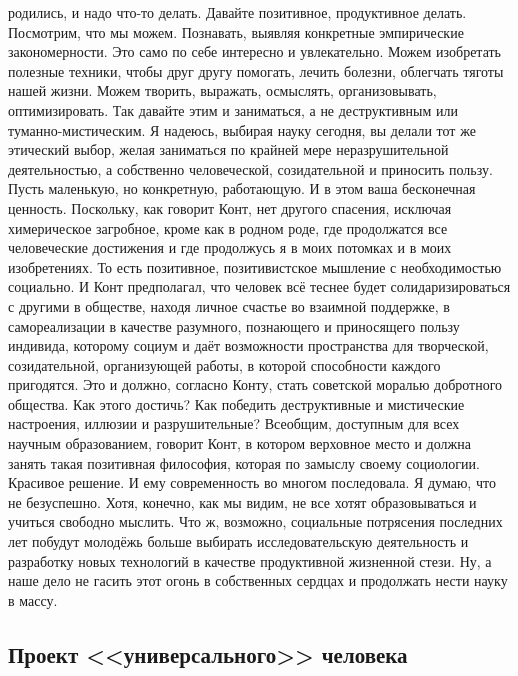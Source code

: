 родились, и надо что-то делать. Давайте позитивное, продуктивное делать.
Посмотрим, что мы можем. Познавать, выявляя конкретные эмпирические
закономерности. Это само по себе интересно и увлекательно. Можем изобретать
полезные техники, чтобы друг другу помогать, лечить болезни, облегчать тяготы
нашей жизни. Можем творить, выражать, осмыслять, организовывать, оптимизировать.
Так давайте этим и заниматься, а не деструктивным или туманно-мистическим. Я
надеюсь, выбирая науку сегодня, вы делали тот же этический выбор, желая
заниматься по крайней мере неразрушительной деятельностью, а собственно
человеческой, созидательной и приносить пользу. Пусть маленькую, но конкретную,
работающую. И в этом ваша бесконечная ценность. Поскольку, как говорит Конт, нет
другого спасения, исключая химерическое загробное, кроме как в родном роде, где
продолжатся все человеческие достижения и где продолжусь я в моих потомках и в
моих изобретениях. То есть позитивное, позитивистское мышление с необходимостью
социально. И Конт предполагал, что человек всё теснее будет солидаризироваться с
другими в обществе, находя личное счастье во взаимной поддержке, в
самореализации в качестве разумного, познающего и приносящего пользу индивида,
которому социум и даёт возможности пространства для творческой, созидательной,
организующей работы, в которой способности каждого пригодятся. Это и должно,
согласно Конту, стать советской моралью добротного общества. Как этого достичь?
Как победить деструктивные и мистические настроения, иллюзии и разрушительные?
Всеобщим, доступным для всех научным образованием, говорит Конт, в котором
верховное место и должна занять такая позитивная философия, которая по замыслу
своему социологии. Красивое решение. И ему современность во многом последовала.
Я думаю, что не безуспешно. Хотя, конечно, как мы видим, не все хотят
образовываться и учиться свободно мыслить. Что ж, возможно, социальные
потрясения последних лет побудут молодёжь больше выбирать исследовательскую
деятельность и разработку новых технологий в качестве продуктивной жизненной
стези. Ну, а наше дело не гасить этот огонь в собственных сердцах и продолжать
нести науку в массу. 

\subsection{Проект <<универсального>> человека}

